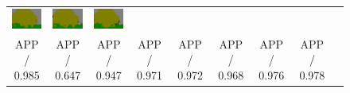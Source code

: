 \documentclass[10pt,twocolumn,letterpaper]{article}
\begin{document}
\begin{figure} [tb]
\begin{tabular*}{0.4\textwidth}{ccccccccc}
\includegraphics[width=2.15cm]{images/2_16_s_A_lmnn_5_label.jpg} &\hspace{-5mm}
\includegraphics[width=2.15cm]{images/2_16_s_J_lmnn_5_label.jpg} & \hspace{-5mm}
\includegraphics[width=2.15cm]{images/2_16_s_R_lmnn_5_label.jpg}  \\
\scriptsize{APP / 0.985} & \scriptsize{APP / 0.647} & \scriptsize{APP / 0.947} & \scriptsize{APP / 0.971}
 & \scriptsize{APP / 0.972} & \scriptsize{APP / 0.968} & \scriptsize{APP / 0.976}  & \scriptsize{APP / 0.978}  \\


\end{tabular*}
\end{figure}
\end{document}
